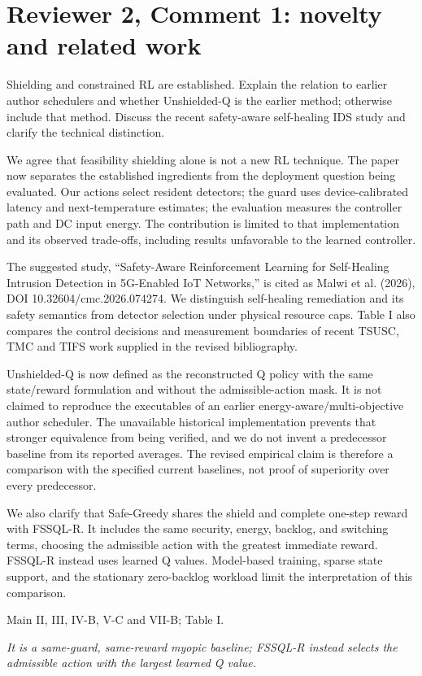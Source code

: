 \documentclass[10pt,a4paper]{article}
\newcommand{\commentbox}[1]{\begin{rcommentbox}#1\end{rcommentbox}}
\newcommand{\responsebox}[1]{\begin{authorresponsebox}#1\end{authorresponsebox}}
\newcommand{\changebox}[1]{\begin{wherebox}#1\end{wherebox}}
\begin{document}
\clearpage
\section*{Reviewer 2, Comment 1: novelty and related work}
\commentbox{Shielding and constrained RL are established. Explain the relation to earlier author schedulers and whether Unshielded-Q is the earlier method; otherwise include that method. Discuss the recent safety-aware self-healing IDS study and clarify the technical distinction.}
\responsebox{We agree that feasibility shielding alone is not a new RL technique. The paper now separates the established ingredients from the deployment question being evaluated. Our actions select resident detectors; the guard uses device-calibrated latency and next-temperature estimates; the evaluation measures the controller path and DC input energy. The contribution is limited to that implementation and its observed trade-offs, including results unfavorable to the learned controller.

The suggested study, ``Safety-Aware Reinforcement Learning for Self-Healing Intrusion Detection in 5G-Enabled IoT Networks,'' is cited as Malwi et al. (2026), DOI 10.32604/cmc.2026.074274. We distinguish self-healing remediation and its safety semantics from detector selection under physical resource caps. Table I also compares the control decisions and measurement boundaries of recent TSUSC, TMC and TIFS work supplied in the revised bibliography.

Unshielded-Q is now defined as the reconstructed Q policy with the same state/reward formulation and without the admissible-action mask. It is not claimed to reproduce the executables of an earlier energy-aware/multi-objective author scheduler. The unavailable historical implementation prevents that stronger equivalence from being verified, and we do not invent a predecessor baseline from its reported averages. The revised empirical claim is therefore a comparison with the specified current baselines, not proof of superiority over every predecessor.

We also clarify that Safe-Greedy shares the shield and complete one-step reward with FSSQL-R. It includes the same security, energy, backlog, and switching terms, choosing the admissible action with the greatest immediate reward. FSSQL-R instead uses learned Q values. Model-based training, sparse state support, and the stationary zero-backlog workload limit the interpretation of this comparison.}
\changebox{Main II, III, IV-B, V-C and VII-B; Table I.}
\begin{excerptbox}\emph{It is a same-guard, same-reward myopic baseline; FSSQL-R instead selects the admissible action with the largest learned Q value.}\end{excerptbox}
\end{document}
